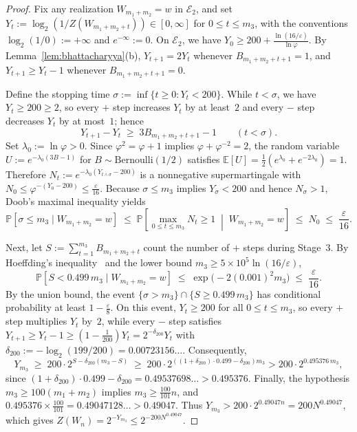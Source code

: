 \documentclass[10pt,a4paper]{article}
\numberwithin{equation}{section}
\theoremstyle{plain}
\theoremstyle{definition}
\theoremstyle{remark}
\newcommand{\cE}{\mathcal{E}}
\newcommand{\bE}{\mathbb{E}}
\newcommand{\bP}{\mathbb{P}}
\begin{document}
\begin{proof}
Fix any realization $W_{m_1 + m_2} = w$ in $\cE_2$, and set $Y_t := \log_2(1/Z(W_{m_1 + m_2 + t})) \in [0,\infty]$ for $0 \le t \le m_3$, with the conventions $\log_2(1/0) := +\infty$ and $e^{-\infty} := 0$. On $\cE_2$, we have $Y_0 \ge 200 + \frac{\ln(16/\varepsilon)}{\ln \varphi}$. By Lemma~\ref{lem:bhattacharyya}(b), $Y_{t+1} = 2 Y_t$ whenever $B_{m_1 + m_2 + t + 1} = 1$, and $Y_{t+1} \ge Y_t - 1$ whenever $B_{m_1 + m_2 + t + 1} = 0$.

Define the stopping time $\sigma := \inf\{t \ge 0 : Y_t < 200\}$. While $t < \sigma$, we have $Y_t \ge 200 \ge 2$, so every $+$ step increases $Y_t$ by at least~$2$ and every $-$ step decreases $Y_t$ by at most~$1$; hence
\[
Y_{t+1} - Y_t \;\ge\; 3 B_{m_1 + m_2 + t + 1} - 1 \qquad (t < \sigma).
\]
Set $\lambda_0 := \ln \varphi > 0$. Since $\varphi^2 = \varphi + 1$ implies $\varphi + \varphi^{-2} = 2$, the random variable $U := e^{-\lambda_0(3B - 1)}$ for $B \sim \mathrm{Bernoulli}(1/2)$ satisfies $\bE[U] = \frac{1}{2}(e^{\lambda_0} + e^{-2\lambda_0}) = 1$. Therefore $N_t := e^{-\lambda_0(Y_{t \wedge \sigma} - 200)}$ is a nonnegative supermartingale with $N_0 \le \varphi^{-(Y_0 - 200)} \le \frac{\varepsilon}{16}$. Because $\sigma \le m_3$ implies $Y_{\sigma} < 200$ and hence $N_{\sigma} > 1$, Doob's maximal inequality yields
\[
\bP[\sigma \le m_3 \mid W_{m_1 + m_2} = w] \;\le\; \bP\!\left[\max_{0 \le t \le m_3} N_t \ge 1 \;\middle\vert\; W_{m_1 + m_2} = w\right] \;\le\; N_0 \;\le\; \frac{\varepsilon}{16}.
\]

Next, let $S := \sum_{t=1}^{m_3} B_{m_1 + m_2 + t}$ count the number of $+$ steps during Stage~3. By Hoeffding's inequality~\cite{Hoeffding1963} and the lower bound $m_3 \ge 5 \times 10^5 \ln(16/\varepsilon)$,
\[
\bP[S < 0.499\, m_3 \mid W_{m_1 + m_2} = w] \;\le\; \exp\bigl(-2(0.001)^2 m_3\bigr) \;\le\; \frac{\varepsilon}{16}.
\]
By the union bound, the event $\{\sigma > m_3\} \cap \{S \ge 0.499\, m_3\}$ has conditional probability at least $1 - \frac{\varepsilon}{8}$. On this event, $Y_t \ge 200$ for all $0 \le t \le m_3$, so every $+$ step multiplies $Y_t$ by~$2$, while every $-$ step satisfies $Y_{t+1} \ge Y_t - 1 \ge (1 - \frac{1}{200}) Y_t = 2^{-\delta_{200}} Y_t$ with $\delta_{200} := -\log_2(199/200) = 0.00723156\ldots$. Consequently,
\[
Y_{m_3} \;\ge\; 200 \cdot 2^{S - \delta_{200}(m_3 - S)} \;\ge\; 200 \cdot 2^{((1 + \delta_{200})\cdot 0.499 - \delta_{200}) m_3} > 200 \cdot 2^{0.495376\, m_3},
\]
since $(1 + \delta_{200}) \cdot 0.499 - \delta_{200} = 0.49537698\ldots > 0.495376$. Finally, the hypothesis $m_3 \ge 100(m_1 + m_2)$ implies $m_3 \ge \frac{100}{101} n$, and $0.495376 \times \frac{100}{101} = 0.49047128\ldots > 0.49047$. Thus $Y_{m_3} > 200 \cdot 2^{0.49047 n} = 200 N^{0.49047}$, which gives $Z(W_n) = 2^{-Y_{m_3}} \le 2^{-200 N^{0.49047}}$.
\end{proof}
\end{document}

